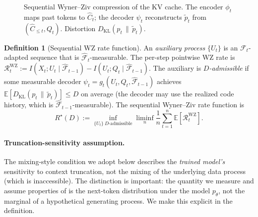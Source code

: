 \documentclass[11pt]{article}
\newcommand{\E}{\mathbb{E}}
\newcommand{\F}{\mathcal{F}}
\newcommand{\Fhat}{\hat{\F}}
\newcommand{\Chat}{\hat{C}}
\newcommand{\KL}[2]{D_{\mathrm{KL}}(#1 \,\|\, #2)}
\theoremstyle{plain}
\theoremstyle{definition}
\newtheorem{definition}[theorem]{Definition}
\theoremstyle{remark}
\begin{document}
\begin{figure}[t]
\centering
{}
\caption{Sequential Wyner--Ziv compression of the KV cache. The
encoder $\phi_t$ maps past tokens to $\Chat_t$; the decoder
$\psi_t$ reconstructs $\tilde p_t$ from
$(\Chat_{\leq t}, Q_t)$. Distortion $\KL{p_t}{\tilde p_t}$.}
\label{fig:setup}
\end{figure}

\begin{definition}[Sequential WZ rate function]
\label{def:Rstar}
An \emph{auxiliary process} $\{U_t\}$ is an $\F_t$-adapted sequence
that is $\Fhat_t$-measurable. The per-step pointwise WZ rate is
$\mathcal{R}_t^{\mathrm{WZ}}
:= I(X_t; U_t \mid \Fhat_{t-1}) - I(U_t; Q_t \mid \Fhat_{t-1})$.
The auxiliary is \emph{$D$-admissible} if some measurable decoder
$\psi_t = g_t(U_t, Q_t, \Fhat_{t-1})$ achieves
$\E[\KL{p_t}{\tilde p_t}] \leq D$ on average (the decoder may use the
realized code history, which is $\Fhat_{t-1}$-measurable). The sequential
Wyner--Ziv rate function is
\[
R^\star(D)
:= \inf_{\{U_t\}\ D\text{-admissible}}
\liminf_{n} \frac{1}{n}\sum_{t=1}^n \E[\mathcal{R}_t^{\mathrm{WZ}}].
\]
\end{definition}

\paragraph{Truncation-sensitivity assumption.}
The mixing-style condition we adopt below describes the
\emph{trained model's} sensitivity to context truncation, not the
mixing of the underlying data process (which is inaccessible). The
distinction is important: the quantity we measure and assume
properties of is the next-token distribution under the model
$p_\theta$, not the marginal of a hypothetical generating process.
We make this explicit in the definition.
\end{document}
